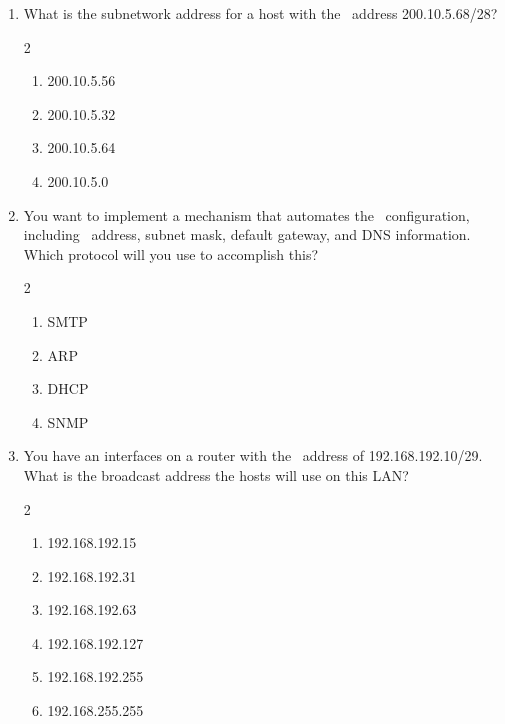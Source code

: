 \begin{enumerate}
   \begin{multicols}{2}
   \begin{enumerate}
   \item 14
   \item 15
   \item 16
   \item 30
   \item 31
   \item 62
   \end{enumerate}
   \end{multicols}
\item
   What is the subnetwork address for a host with the \IP\ address 200.10.5.68/28?
   \begin{multicols}{2}
   \begin{enumerate}
   \item 200.10.5.56
   \item 200.10.5.32
   \item 200.10.5.64
   \item 200.10.5.0
   \end{enumerate}
   \end{multicols}
\item
   You want to implement a mechanism that automates the \IP\ configuration, including \IP\ address, subnet mask, default gateway, and \acs{DNS} information.
   Which protocol will you use to accomplish this?
   \begin{multicols}{2}
   \begin{enumerate}
   \item \acs{SMTP}
   \item \acs{ARP}
   \item \acs{DHCP}
   \item \acs{SNMP}
   \end{enumerate}
   \end{multicols}
\item
   You have an interfaces on a router with the \IP\ address of 192.168.192.10/29.
   What is the broadcast address the hosts will use on this \acs{LAN}?
   \begin{multicols}{2}
   \begin{enumerate}
   \item 192.168.192.15
   \item 192.168.192.31
   \item 192.168.192.63
   \item 192.168.192.127
   \item 192.168.192.255
   \item 192.168.255.255

\end{enumerate}
\end{multicols}
\end{enumerate}
